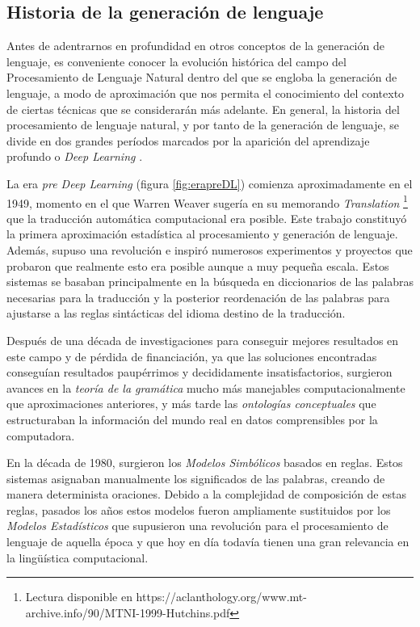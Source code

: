 \subsection{Historia de la generación de lenguaje}
Antes de adentrarnos en profundidad en otros conceptos de la generación de lenguaje, es conveniente conocer la evolución histórica del campo del Procesamiento de Lenguaje Natural dentro del que se engloba la generación de lenguaje, a modo de aproximación que nos permita el conocimiento del contexto de ciertas técnicas que se considerarán más adelante. En general, la historia del procesamiento de lenguaje natural, y por tanto de la generación de lenguaje, se divide en dos grandes períodos marcados por la aparición del aprendizaje profundo o \textit{Deep Learning} \citep{louis-2021}. 

La era \textit{pre Deep Learning} (figura \ref{fig:erapreDL}) comienza aproximadamente en el 1949, momento en el que Warren Weaver sugería en su memorando \textit{Translation} \footnote{Lectura disponible en https://aclanthology.org/www.mt-archive.info/90/MTNI-1999-Hutchins.pdf} que la traducción automática computacional era posible. Este trabajo constituyó la primera aproximación estadística al procesamiento y generación de lenguaje. Además, supuso una revolución e inspiró numerosos experimentos y proyectos que probaron que realmente esto era posible aunque a muy pequeña escala. Estos sistemas se basaban principalmente en la búsqueda en diccionarios de las palabras necesarias para la traducción y la posterior reordenación de las palabras para ajustarse a las reglas sintácticas del idioma destino de la traducción.

Después de una década de investigaciones para conseguir mejores resultados en este campo y de pérdida de financiación, ya que las soluciones encontradas conseguían resultados paupérrimos y decididamente insatisfactorios, surgieron avances en la \textit{teoría de la gramática} mucho más manejables computacionalmente que aproximaciones anteriores, y más tarde las \textit{ontologías conceptuales} que estructuraban la información del mundo real en datos comprensibles por la computadora.

En la década de 1980, surgieron los \textit{Modelos Simbólicos} basados en reglas. Estos sistemas asignaban manualmente los significados de las palabras, creando de manera determinista oraciones. Debido a la complejidad de composición de estas reglas, pasados los años estos modelos fueron ampliamente sustituidos por los\textit{ Modelos Estadísticos} que supusieron una revolución para el procesamiento de lenguaje de  aquella época y que hoy en día todavía tienen una gran relevancia en la lingüística computacional. 


